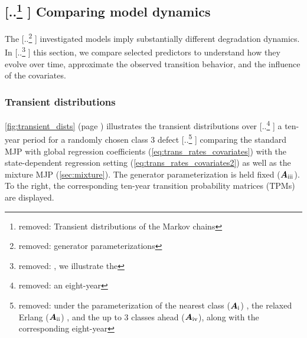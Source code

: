\documentclass{article}
\newcommand{\RN}[1]{\textup{\uppercase\expandafter{\romannumeral#1}}}
\providecommand{\DIFadd}[1]{{\protect\color{blue} \sf #1}} %
\providecommand{\DIFdel}[1]{{\protect\color{red} [..\footnote{removed: #1} ]}} %
\providecommand{\DIFaddbegin}{} %
\providecommand{\DIFaddend}{} %
\providecommand{\DIFdelbegin}{} %
\providecommand{\DIFdelend}{} %
\begin{document}



\DIFdelend \subsection{\DIFdelbegin \DIFdel{Transient distributions of the Markov chains}\DIFdelend \DIFaddbegin \DIFadd{Comparing model dynamics}\DIFaddend } \label{sec:results_transient_dist_markov} 
The \DIFdelbegin \DIFdel{generator parameterizations }\DIFdelend \DIFaddbegin \DIFadd{investigated models }\DIFaddend imply substantially different degradation dynamics. In \DIFdelbegin \DIFdel{, %
we illustrate the }\DIFdelend \DIFaddbegin \DIFadd{this section, we compare selected predictors to understand how they evolve over time, approximate the observed transition behavior, and the influence of the covariates.
}

\subsubsection{\DIFadd{Transient distributions}}

\DIFadd{\cref{fig:transient_dists} (page \pageref{fig:transient_dists}) illustrates the }\DIFaddend transient distributions over \DIFdelbegin \DIFdel{an eight-year }\DIFdelend \DIFaddbegin \DIFadd{a ten-year }\DIFaddend period for a randomly chosen class $3$ defect
\DIFdelbegin \DIFdel{under the parameterization of the nearest class ($\bm{A}_{\RN{1}}$) , the relaxed Erlang ($\bm{A}_{\RN{2}}$) , and the up to 3 classes ahead ($\bm{A}_{\RN{4}}$), 
along with the corresponding eight-year }\DIFdelend \DIFaddbegin \DIFadd{comparing the standard MJP with global regression coefficients (\cref{eq:trans_rates_covariates}) with the state-dependent regression setting (\cref{eq:trans_rates_covariates2}) as well as the mixture MJP (\cref{sec:mixture}). The generator parameterization is held fixed ($\bm{A}_{\RN{3}}$). To the right, the corresponding ten-year }\DIFaddend transition probability matrices \DIFaddbegin \DIFadd{(TPMs) are displayed}\DIFaddend .
\end{document}

